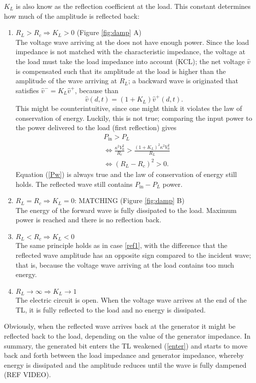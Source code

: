 $K_L$ is also know as the reflection coefficient at the load. This constant determines how much of the amplitude is reflected back:
\begin{enumerate}
\item $R_L > R_c \Rightarrow K_L > 0$ \label{ref1} (Figure \ref{fig:damp} A) \\
	The voltage wave arriving at the does not have enough power. Since the load impedance is not matched with the characteristic impedance, the voltage at the load must take the load impedance into account (KCL); the net voltage $\hat{v}$ is compensated such that its amplitude at the load is higher than the amplitude of the wave arriving at $R_L$; a backward wave is originated that satisfies $\hat{v}^{-} = K_L\hat{v}^{+}$, because than $$\hat{v}(d, t) = (1 + K_L)\hat{v}^{+}(d, t).$$ This might be counterintuitive, since one might think it violates the law of conservation of energy. Luckily, this is not true; comparing the input power to the power delivered to the load (first reflection) gives
	\begin{align}
		&P_{\text{in}} > P_L \\
		&\Leftrightarrow \frac{\kappa^2 V^2_0}{R_c} > \frac{(1 + K_L)^2\kappa^2V^2_0}{R_L} \\
		&\Leftrightarrow (R_L-R_c)^2 > 0 \label{Pw}.
	\end{align}
Equation (\ref{Pw}) is always true and the law of conservation of energy still holds. The reflected wave still contains $P_{\text{in}} - P_L$ power.
\item $R_L = R_c \Rightarrow K_L = 0$: MATCHING (Figure \ref{fig:damp} B)\\
	The energy of the forward wave is fully dissipated to the load. Maximum power is reached and there is no reflection back.
	
\item $R_L < R_c \Rightarrow K_L <0$ \\
	The same principle holds as in case \ref{ref1}, with the difference that the reflected wave amplitude has an opposite sign compared to the incident wave; that is, because the voltage wave arriving at the load contains too much energy.

\item $R_L \longrightarrow \infty \Rightarrow K_L \longrightarrow 1$ \\
	The electric circuit is open. When the voltage wave arrives at the end of the TL, it is fully reflected to the load and no energy is dissipated.
	
\end{enumerate}
Obviously, when the reflected wave arrives back at the generator it might be reflected back to the load, depending on the value of the generator impedance. In summary, the generated bit enters the TL weakened (\ref{enter}) and starts to move back and forth between the load impedance and generator impedance, whereby energy is dissipated and the amplitude reduces until the wave is fully dampened (REF VIDEO).

